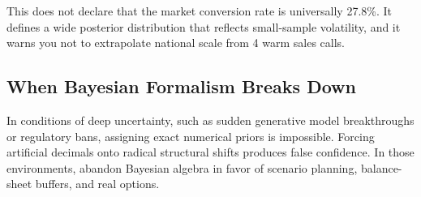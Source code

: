 This does not declare that the market conversion rate is universally 27.8\%. It defines a wide posterior distribution that reflects small-sample volatility, and it warns you not to extrapolate national scale from 4 warm sales calls.

\subsection{When Bayesian Formalism Breaks Down}

In conditions of deep uncertainty, such as sudden generative model breakthroughs or regulatory bans, assigning exact numerical priors is impossible. Forcing artificial decimals onto radical structural shifts produces false confidence. In those environments, abandon Bayesian algebra in favor of scenario planning, balance-sheet buffers, and real options.
